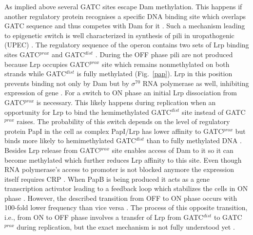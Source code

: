 As implied above several GATC sites escape Dam methylation.
This happens if another regulatory protein recognises a specific DNA binding site which overlaps GATC sequence and thus competes with Dam for it \cite{correnti2002dam}.
Such a mechanism leading to epigenetic switch is well characterized in synthesis of  pili in uropathogenic  (UPEC) \cite{peterson2008competitive}.
The regulatory sequence of the  operon contains two sets of Lrp binding sites GATC$^{prox}$ and GATC$^{dist}$ \cite{blyn1990regulation}.
During the OFF phase  pili are not produced because Lrp occupies GATC$^{prox}$ site which remains nonmethylated on both strands while GATC$^{dist}$ is fully methylated (Fig.~\ref{pap}).
Lrp in this position prevents binding not only by Dam but by $\sigma^{70}$ RNA polymerase as well, inhibiting expression of  gene \cite{weyand2000regulation}.
For a switch to ON phase an initial Lrp dissociation from GATC$^{prox}$ is necessary.
This likely happens during replication when an opportunity for Lrp to bind the hemimethylated GATC$^{dist}$ site instead of GATC$^{prox}$ raises.
The probability of this switch depends on the level of regulatory protein PapI in the cell as complex PapI/Lrp has lower affinity to GATC$^{prox}$ but binds more likely to hemimethylated GATC$^{dist}$ than to fully methylated DNA \cite{hernday2003mechanism}.
Besides Lrp release from GATC$^{prox}$ site enables access of Dam to it so it can become methylated which further reduces Lrp affinity to this site.
Even though RNA polymerase's access to  promoter is not blocked anymore the expression itself requires CRP \cite{weyand2001essential}.
When PapB is being produced it acts as a  gene transcription activator leading to a feedback loop which stabilizes the cells in ON phase \cite{forsman1989autoregulation}.
However, the described transition from OFF to ON phase occurs with 100-fold lower frequency than vice versa \cite{blyn1990regulation}.
The process of this opposite transition, i.e., from ON to OFF phase involves a transfer of Lrp from GATC$^{dist}$ to GATC$^{prox}$ during replication, but the exact mechanism is not fully understood yet \cite{adhikari2016dna}.

